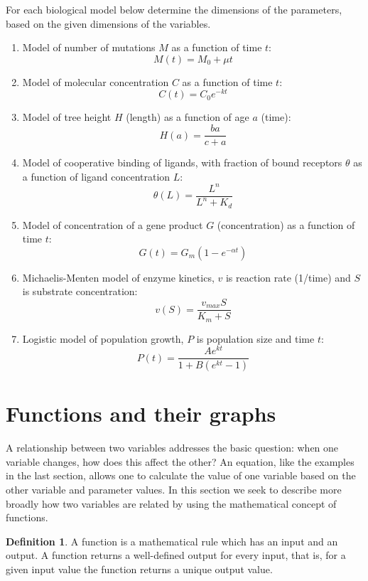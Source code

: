 \documentclass[
]{book}
\theoremstyle{definition}
\newtheorem{definition}{Definition}[chapter]
\theoremstyle{definition}
\theoremstyle{definition}
\theoremstyle{remark}
\begin{document}
For each biological model below determine the dimensions of the parameters, based on the given dimensions of the variables.

\begin{enumerate}
\def\labelenumi{\arabic{enumi}.}
\item
  Model of number of mutations \(M\) as a function of time \(t\):
  \[ M(t) = M_0 + \mu t\]
\item
  Model of molecular concentration \(C\) as a function of time \(t\):
  \[ C(t) = C_0 e^{-kt} \]
\item
  Model of tree height \(H\) (length) as a function of age \(a\) (time):
  \[ H(a) = \frac{b a}{c + a}\]
\item
  Model of cooperative binding of ligands, with fraction of bound receptors \(\theta\) as a function of ligand concentration \(L\):
  \[ \theta (L) = \frac{L^n}{L^n + K_d}\]
\item
  Model of concentration of a gene product \(G\) (concentration) as a function of time \(t\):
  \[ G(t) = G_m (1 - e^{-\alpha t})\]
\item
  Michaelis-Menten model of enzyme kinetics, \(v\) is reaction rate (1/time) and \(S\) is substrate concentration:
  \[ v(S) = \frac{v_{max} S}{K_m + S}\]
\item
  Logistic model of population growth, \(P\) is population size and time \(t\):
  \[ P(t) = \frac{A e^{kt}}{1 + B(e^{kt} -1)} \]
\end{enumerate}

\hypertarget{sec:math2}{%
\section{Functions and their graphs}\label{sec:math2}}

A relationship between two variables addresses the basic question: when one variable changes, how does this affect the other? An equation, like the examples in the last section, allows one to calculate the value of one variable based on the other variable and parameter values. In this section we seek to describe more broadly how two variables are related by using the mathematical concept of functions.

\begin{definition}
\protect\hypertarget{def:def-function}{}{\label{def:def-function} }A function is a mathematical rule which has an input and an output. A function returns a well-defined output for every input, that is, for a given input value the function returns a unique output value.
\end{definition}
\end{document}
